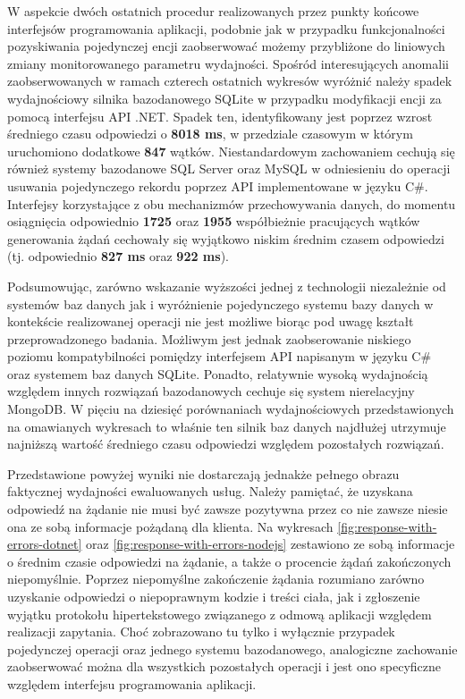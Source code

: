 W aspekcie dwóch ostatnich procedur realizowanych przez punkty końcowe interfejsów programowania aplikacji, podobnie jak w przypadku funkcjonalności pozyskiwania pojedynczej encji zaobserwować możemy przybliżone do liniowych zmiany monitorowanego parametru wydajności. Spośród interesujących anomalii zaobserwowanych w ramach czterech ostatnich wykresów wyróżnić należy spadek wydajnościowy silnika bazodanowego SQLite w przypadku modyfikacji encji za pomocą interfejsu API .NET. Spadek ten, identyfikowany jest poprzez wzrost średniego czasu odpowiedzi o \textbf{8018 ms}, w przedziale czasowym w którym uruchomiono dodatkowe \textbf{847} wątków. Niestandardowym zachowaniem cechują się również systemy bazodanowe SQL Server oraz MySQL w odniesieniu do operacji usuwania pojedynczego rekordu poprzez API implementowane w języku C\#. Interfejsy korzystające z obu mechanizmów przechowywania danych, do momentu osiągnięcia odpowiednio \textbf{1725} oraz \textbf{1955} współbieżnie pracujących wątków generowania żądań cechowały się wyjątkowo niskim średnim czasem odpowiedzi (tj. odpowiednio \textbf{827 ms} oraz \textbf{922 ms}).

Podsumowując, zarówno wskazanie wyższości jednej z technologii niezależnie od systemów baz danych jak i wyróżnienie pojedynczego systemu bazy danych w kontekście realizowanej operacji nie jest możliwe biorąc pod uwagę kształt przeprowadzonego badania. Możliwym jest jednak zaobserowanie niskiego poziomu kompatybilności pomiędzy interfejsem API napisanym w języku C\# oraz systemem baz danych SQLite. Ponadto, relatywnie wysoką wydajnością względem innych rozwiązań bazodanowych cechuje się system nierelacyjny MongoDB. W pięciu na dziesięć porównaniach wydajnościowych przedstawionych na omawianych wykresach to właśnie ten silnik baz danych najdłużej utrzymuje najniższą wartość średniego czasu odpowiedzi względem pozostałych rozwiązań.

Przedstawione powyżej wyniki nie dostarczają jednakże pełnego obrazu faktycznej wydajności ewaluowanych usług. Należy pamiętać, że uzyskana odpowiedź na żądanie nie musi być zawsze pozytywna przez co nie zawsze niesie ona ze sobą informacje pożądaną dla klienta. Na wykresach \ref{fig:response-with-errors-dotnet} oraz \ref{fig:response-with-errors-nodejs} zestawiono ze sobą informacje o średnim czasie odpowiedzi na żądanie, a także o procencie żądań zakończonych niepomyślnie. Poprzez niepomyślne zakończenie żądania rozumiano zarówno uzyskanie odpowiedzi o niepoprawnym kodzie i treści ciała, jak i zgłoszenie wyjątku protokołu hipertekstowego związanego z odmową aplikacji względem realizacji zapytania. Choć zobrazowano tu tylko i wyłącznie przypadek pojedynczej operacji oraz jednego systemu bazodanowego, analogiczne zachowanie zaobserwować można dla wszystkich pozostałych operacji i jest ono specyficzne względem interfejsu programowania aplikacji. 

